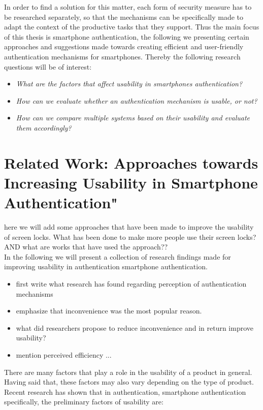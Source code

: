 In order to find a solution for this matter, each form of security measure has to be researched separately, so that the mechanisms can be specifically made to adapt the context of the productive tasks that they support. Thus the main focus of this thesis is smartphone authentication, the following we
presenting certain approaches and suggestions made towards creating efficient and user-friendly authentication mechanisms for smartphones. Thereby the following research questions will be of interest: 


\begin{itemize}
    \item \textit{What are the factors that affect usability in smartphones authentication?}
\item \textit{How can we evaluate whether an authentication mechanism is usable, or not?} 
    \item \textit{How can we compare multiple systems based on their usability and evaluate them accordingly?}
\end{itemize}


\section{Related Work: Approaches towards Increasing Usability in Smartphone Authentication"}


here we will add some approaches that have been made to improve the usability of screen locks. What has been done to make more people use their screen locks? AND what are works that have used the approach??\\

In the following we will present a collection of research findings made for improving usability in authentication smartphone authentication. 
\begin{itemize}
    \item first write what research has found regarding perception of authentication mechanisms 
    \item emphasize that inconvenience was the most popular reason.
    \item what did researchers propose to reduce inconvenience and in return improve usability? 
    \item mention perceived efficiency ... 

\end{itemize}

There are many factors that play a role in the usability of a product in general. Having said that, these factors may also vary depending on the type of product. Recent research has shown that in authentication, smartphone authentication specifically, the preliminary factors of usability are: 

